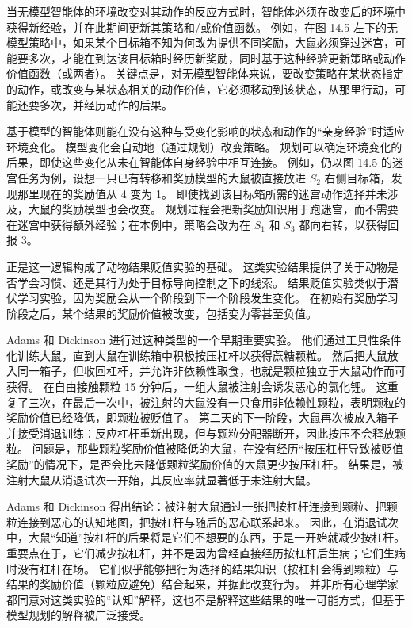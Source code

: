 \documentclass[UTF8,12pt,a4paper,fontset=fandol]{ctexart}
\begin{document}
当无模型智能体的环境改变对其动作的反应方式时，智能体必须在改变后的环境中获得新经验，并在此期间更新其策略和/或价值函数。
例如，在图 14.5 左下的无模型策略中，如果某个目标箱不知为何改为提供不同奖励，大鼠必须穿过迷宫，可能要多次，才能在到达该目标箱时经历新奖励，同时基于这种经验更新策略或动作价值函数（或两者）。
关键点是，对无模型智能体来说，要改变策略在某状态指定的动作，或改变与某状态相关的动作价值，它必须移动到该状态，从那里行动，可能还要多次，并经历动作的后果。

基于模型的智能体则能在没有这种与受变化影响的状态和动作的“亲身经验”时适应环境变化。
模型变化会自动地（通过规划）改变策略。
规划可以确定环境变化的后果，即使这些变化从未在智能体自身经验中相互连接。
例如，仍以图 14.5 的迷宫任务为例，设想一只已有转移和奖励模型的大鼠被直接放进 $S_2$ 右侧目标箱，发现那里现在的奖励值从 4 变为 1。
即使找到该目标箱所需的迷宫动作选择并未涉及，大鼠的奖励模型也会改变。
规划过程会把新奖励知识用于跑迷宫，而不需要在迷宫中获得额外经验；在本例中，策略会改为在 $S_1$ 和 $S_3$ 都向右转，以获得回报 3。

正是这一逻辑构成了动物结果贬值实验的基础。
这类实验结果提供了关于动物是否学会习惯、还是其行为处于目标导向控制之下的线索。
结果贬值实验类似于潜伏学习实验，因为奖励会从一个阶段到下一个阶段发生变化。
在初始有奖励学习阶段之后，某个结果的奖励价值被改变，包括变为零甚至负值。

Adams 和 Dickinson 进行过这种类型的一个早期重要实验。
他们通过工具性条件化训练大鼠，直到大鼠在训练箱中积极按压杠杆以获得蔗糖颗粒。
然后把大鼠放入同一箱子，但收回杠杆，并允许非依赖性取食，也就是颗粒独立于大鼠动作而可获得。
在自由接触颗粒 15 分钟后，一组大鼠被注射会诱发恶心的氯化锂。
这重复了三次，在最后一次中，被注射的大鼠没有一只食用非依赖性颗粒，表明颗粒的奖励价值已经降低，即颗粒被贬值了。
第二天的下一阶段，大鼠再次被放入箱子并接受消退训练：反应杠杆重新出现，但与颗粒分配器断开，因此按压不会释放颗粒。
问题是，那些颗粒奖励价值被降低的大鼠，在没有经历“按压杠杆导致被贬值奖励”的情况下，是否会比未降低颗粒奖励价值的大鼠更少按压杠杆。
结果是，被注射大鼠从消退试次一开始，其反应率就显著低于未注射大鼠。

Adams 和 Dickinson 得出结论：被注射大鼠通过一张把按杠杆连接到颗粒、把颗粒连接到恶心的认知地图，把按杠杆与随后的恶心联系起来。
因此，在消退试次中，大鼠“知道”按杠杆的后果将是它们不想要的东西，于是一开始就减少按杠杆。
重要点在于，它们减少按杠杆，并不是因为曾经直接经历按杠杆后生病；它们生病时没有杠杆在场。
它们似乎能够把行为选择的结果知识（按杠杆会得到颗粒）与结果的奖励价值（颗粒应避免）结合起来，并据此改变行为。
并非所有心理学家都同意对这类实验的“认知”解释，这也不是解释这些结果的唯一可能方式，但基于模型规划的解释被广泛接受。
\end{document}
